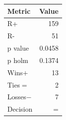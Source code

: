 \zebra
\begin{tabular}{lr}
\toprule
\textbf{Metric} & \textbf{Value} \\
\midrule
R+ & 159 \\
R- & 51 \\
p value & 0.0458 \\
p holm & 0.1374 \\
Wins$+$ & 13 \\
Ties$=$ & 2 \\
Losses$-$ & 7 \\
Decision & = \\
\bottomrule
\end{tabular}

